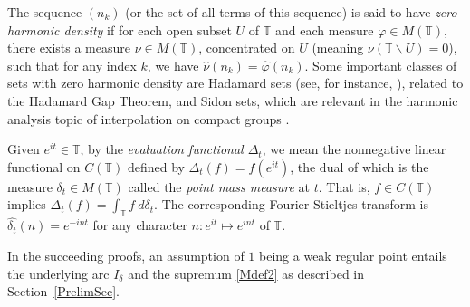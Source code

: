 \documentclass[11pt,a4paper]{article}
\newcommand{\T}{\mathbb{T}}
\def\setdiff{\backslash}
\begin{document}
The sequence $(n_k)$ (or the set of all terms of this sequence) is said to have \emph{zero harmonic density} if for each open subset $U$ of $\T$ and each measure $\varphi\in M(\T)$, there exists a measure $\nu\in M(\T)$, concentrated on $U$ (meaning $\nu(\T\setdiff U)=0$), such that for any index $k$, we have $\widehat{\nu}(n_k)=\widehat{\varphi}(n_k)$. Some important classes of sets with zero harmonic density are Hadamard sets (see, for instance, \cite[Chapter~1]{gra13}), related  to the Hadamard Gap Theorem, and Sidon sets, which are relevant in the harmonic analysis topic of interpolation on compact groups \cite[Chapter~6]{gra13}.

Given $e^{it}\in\T$, by the \emph{evaluation functional $\Delta_t$}, we mean the nonnegative linear functional on $C(\T)$ defined by $\Delta_t(f)=f(e^{it})$, the dual of which is the measure $\delta_t\in M(\T)$ called the \emph{point mass measure} at $t$. That is, $f\in C(\T)$ implies $\Delta_t(f)=\int_\T f\  d\delta_t$. The corresponding Fourier-Stieltjes transform is $\widehat{\delta_t}(n)=e^{-int}$ for any character $n:e^{it}\mapsto e^{int}$ of $\T$.

In the succeeding proofs, an assumption of $1$ being a weak regular point entails the underlying arc $I_\delta$ and the supremum \eqref{Mdef2} as described in Section~\ref{PrelimSec}.
\end{document}
